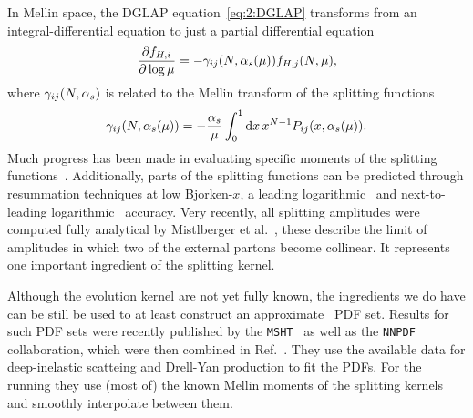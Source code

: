 In Mellin space, the DGLAP equation~\eqref{eq:2:DGLAP} transforms from an integral-differential equation to just a partial differential equation
\begin{equation}
\frac{\partial f_{H,i}}{\partial \log \mu} = - \gamma_{ij}(N, \alpha_s(\mu)) f_{H, j}(N, \mu),
\end{equation}
where $\gamma_{ij}(N, \alpha_s)$ is related to the Mellin transform of the splitting functions
\begin{equation}
\gamma_{ij}(N, \alpha_s(\mu)) = - \frac{\alpha_s}{\mu} \int_0^1 \mathrm{d} x \, x^{N - 1} P_{ij}(x, \alpha_s (\mu)).
\end{equation}
Much progress has been made in evaluating specific moments of the splitting functions~\cite{Moch:2017uml, Moch:2021qrk, Davies:2016jie, Falcioni:2023tzp, Gehrmann:2023cqm, Falcioni:2023luc, Gehrmann:2023iah}. Additionally, parts of the splitting functions can be predicted through resummation techniques at low Bjorken-$x$, a leading logarithmic~\cite{Jaroszewicz:1982gr} and next-to-leading logarithmic~\cite{Ball:1995vc, Ball:1999sh, Bonvini:2018xvt} accuracy. Very recently, all splitting amplitudes were computed fully analytical by Mistlberger et al.~\cite{Guan:2024hlf}, these describe the limit of amplitudes in which two of the external partons become collinear. It represents one important ingredient of the splitting kernel.

Although the evolution kernel are not yet fully known, the ingredients we do have can be still be used to at least construct an approximate \NNNLO\ \acs{PDF} set. Results for such \acs{PDF} sets were recently published by the \texttt{MSHT}~\cite{McGowan:2022nag} as well as the \texttt{NNPDF}~\cite{NNPDF:2024nan} collaboration, which were then combined in Ref.~\cite{MSHT:2024tdn}. They use the available data for deep-inelastic scatteing and Drell-Yan production to fit the \acs{PDF}s. For the running they use (most of) the known Mellin moments of the splitting kernels and smoothly interpolate between them.

